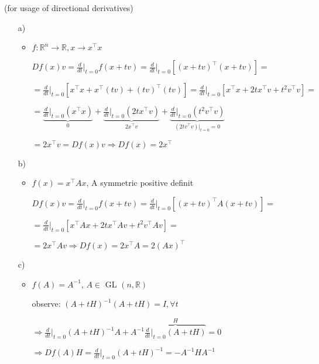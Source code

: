 \newpage
\begin{bsp}
	\blank
	 (for usage of directional derivatives)\\
	\begin{itemize}
		\item[a)]\begin{itemize}
			\item $f: \mathbb{R}^n \rightarrow \mathbb{R}, x \rightarrow x^\top x$\\
			\item[]$Df(x)v = \frac{d}{dt}\bigg|_{t=0}f(x+tv) = \frac{d}{dt}\bigg|_{t=0} [(x+tv)^\top (x+tv)] =$ \\
			\item[] $=\frac{d}{dt}\bigg|_{t=0}[x^\top x+x^\top (tv) +(tv)^\top(tv)] = \frac{d}{dt}\bigg|_{t=0}[x^\top x + 2tx^\top v + t^2 v^\top v] =$\\
			\item[] $=\underbrace{\frac{d}{dt}\bigg|_{t=0} (x^\top x)}_{0} + \underbrace{\frac{d}{dt}\bigg|_{t=0} (2tx^\top v)}_{2x^\top v} + \underbrace{\frac{d}{dt}\bigg|_{t=0}(t^2 v^\top v)}_{(2tv^\top v)\bigg|_{t=0} = 0}$\\
			\item[]$= 2x^\top v = Df(x)v \Rightarrow Df(x) = 2x^\top$
		\end{itemize}
		\item[b)] \begin{itemize}
			\item $f(x) = x^\top Ax$, A symmetric positive definit\\
			\item[] $Df(x)v = \frac{d}{dt}\bigg|_{t=0}f(x+tv) = \frac{d}{dt}\bigg|_{t=0} [(x+tv)^\top A(x+tv)] =$ \\
			\item[] $=\frac{d}{dt}\bigg|_{t=0}[x^\top Ax+2tx^\top Av + t^2 v^\top Av] =$\\
			\item[] $ = 2x^\top Av \Rightarrow Df(x) = 2x^\top A = 2(Ax)^\top$\\
		\end{itemize}
		\item[c)] \begin{itemize}
			\item $f(A) = A^{-1}$, $A \in$ GL $(n,\mathbb{R})$\\
			\item[] observe: $(A+tH)^{-1} (A+tH) = I, \forall{t}$\\
			\item[] $\Rightarrow \frac{d}{dt}\bigg|_{t=0}(A+tH)^{-1} A + A^{-1} \overbrace{\frac{d}{dt}\bigg|_{t=0}(A+tH)}^{H} = 0$\\
			\item[] $\Rightarrow Df(A)H = \frac{d}{dt}\bigg|_{t=0}(A+tH)^{-1} = -A^{-1}HA^{-1}$
		\end{itemize}
	\end{itemize}
\end{bsp}

